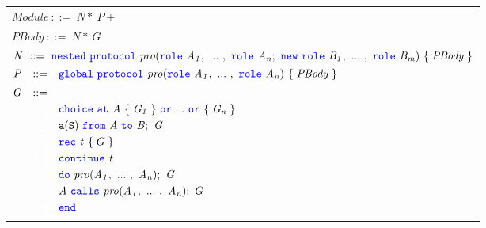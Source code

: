 \documentclass[12pt,twoside]{report}
\begin{document}
\begin{figure}[!h]
    \begin{center}
        \begin{tabular}{l}
            $\mathit{Module}\ ::=\ \mathit{N}\!*\ \mathit{P}+$\\[8pt]

            $\mathit{PBody}\ ::=\  \mathit{N}\!*\ \mathit{G}$\\[8pt]

            $\mathit{N}\ ::=\ \nested\ \protocol\ \mathit{pro}(\rolessig{A}{n};\ \scrnew\ \rolessig{B}{m})\ \{\;\mathit{PBody}\;\}$\\[8pt]
            
            \begin{math}
                \begin{array}{@{}rcl}
                    \mathit{P} & ::= & \scrglobal\ \protocol\ \mathit{pro}(\rolessig{A}{n})\ \{\;\mathit{PBody}\;\}\\[5pt]
                    \mathit{G} & ::= &\\[2.75pt]
                        &   | & \choice\ \at\ \mathit{A}\ \{\;\mathit{G_1}\;\}\ \scror\ ...\ \scror\ \{\;\mathit{G_n}\;\} \\[2.75pt]
                        &   | & \scrmessage{a}{S}\ \from\ \mathit{A}\ \scrto\ \mathit{B};\ \mathit{G} \\[2.75pt]
                        &   | & \rec\ \mathit{t}\ \{\;G\;\} \\[2.75pt]
                        &   | &  \continue\ \mathit{t} \\[2.75pt]
                        &   | & \scrdo\ \mathit{pro}(\roles{A}{n});\ \mathit{G} \\[2.75pt]
                        &   | &  \mathit{A}\ \calls\ \mathit{pro}(\roles{A}{n});\ G\\[2.75pt]
                        &   | & \scrend \\[2.75pt]
                \end{array}
            \end{math}
        \end{tabular}
    \end{center}


\end{figure}
\end{document}
